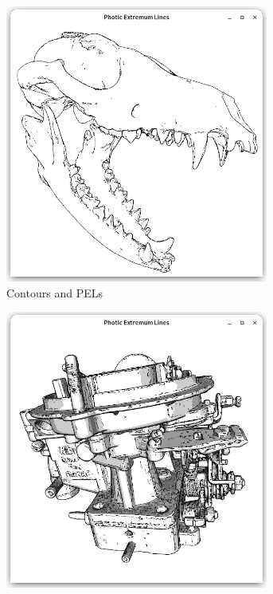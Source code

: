 \documentclass[9pt,fleqn,twoside,twocolumn]{stdglobal}
\begin{document}
\begin{figure}
\begin{subfigure}[t]{0.19\textwidth}
        \includegraphics[width=0.95\textwidth,trim={15px 15 15 50},clip]{images/results/skull-contours-pel.png}
        \caption{Contours and PELs}
      \end{subfigure}%
      \hfill
      \begin{subfigure}[t]{0.19\textwidth}
        \centering
        \includegraphics[width=0.95\textwidth,trim={15px 15 15 50},clip]{images/results/carburetor-contours-pel-toon.png}

\end{subfigure}
\end{figure}
\end{document}
